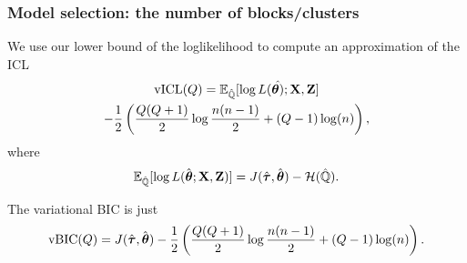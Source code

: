 \documentclass{beamer}\usepackage[]{graphicx}\usepackage[]{color}
\begin{document}
\begin{frame}
  \frametitle{Model selection: the number of blocks/clusters}

  We use our lower bound of the  loglikelihood to compute an approximation of the ICL
  \begin{multline*}
  \mathrm{vICL}(Q) = \mathbb{E}_{\hat{\mathbb{Q}}} [\log L(\hat{\boldsymbol\theta)};\mathbf{X},\mathbf{Z}] \\ - \frac{1}{2} \left(\frac{Q(Q+1)}{2} \log \frac{n(n-1)}{2} + (Q-1) \log (n) \right),
\end{multline*}
where
    \begin{equation*}
      \mathbb{E}_{\hat{\mathbb{Q}}} [\log L(\hat{\boldsymbol\theta}; \mathbf{X},\mathbf{Z})] = J(\hat{\boldsymbol\tau},\hat{\boldsymbol\theta}) - \mathcal{H}(\hat{\mathbb{Q}}).
    \end{equation*}

    The variational BIC is just
    \begin{equation*}
  \mathrm{vBIC}(Q) = J(\hat{\boldsymbol\tau},\hat{\boldsymbol\theta}) - \frac{1}{2} \left(\frac{Q(Q+1)}{2} \log \frac{n(n-1)}{2} + (Q-1) \log (n) \right).
    \end{equation*}

\end{frame}
\end{document}
